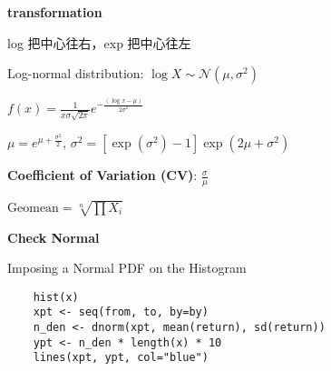 \documentclass[9pt,landscape]{article}
\begin{document}
\begin{multicols}{3}
\textbf{transformation}

log 把中心往右，exp 把中心往左

Log-normal distribution: $\log X\sim\mathcal{N}(\mu,\sigma^2)$

$f(x)=\frac{1}{x\sigma\sqrt{2\pi}}e^{-\frac{(\log x-\mu)}{2\sigma^2}}$

$\mu=e^{\mu+\frac{\sigma^2}{2}}$, $\sigma^2=[\exp(\sigma^2)-1]\exp(2\mu+\sigma^2)$

\textbf{Coefficient of Variation (CV)}: $\frac{\sigma}{\mu}$

$\mathrm{Geomean}=\sqrt[n]{\prod X_i}$

\textbf{Check Normal}

Imposing a Normal PDF on the Histogram

\begin{lstlisting}
	hist(x)
	xpt <- seq(from, to, by=by)
	n_den <- dnorm(xpt, mean(return), sd(return))
	ypt <- n_den * length(x) * 10
	lines(xpt, ypt, col="blue")
\end{lstlisting}

\end{multicols}
\end{document}
